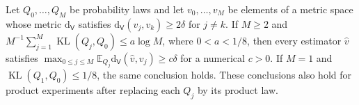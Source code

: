 Let \(Q_0,\ldots,Q_M\) be probability laws and let \(v_0,\ldots,v_M\) be elements of a metric space whose metric \(\mathrm d_{\mathsf V}\) satisfies \(\mathrm d_{\mathsf V}(v_j,v_k)\ge 2\delta\) for \(j\ne k\). If \(M\ge2\) and \(M^{-1}\sum_{j=1}^M\operatorname{KL}(Q_j,Q_0)\le a\log M\), where \(0<a<1/8\), then every estimator \(\widehat v\) satisfies \(\max_{0\le j\le M}\mathbb E_{Q_j}\mathrm d_{\mathsf V}(\widehat v,v_j)\ge c\delta\) for a numerical \(c>0\). If \(M=1\) and \(\operatorname{KL}(Q_1,Q_0)\le1/8\), the same conclusion holds. These conclusions also hold for product experiments after replacing each \(Q_j\) by its product law.